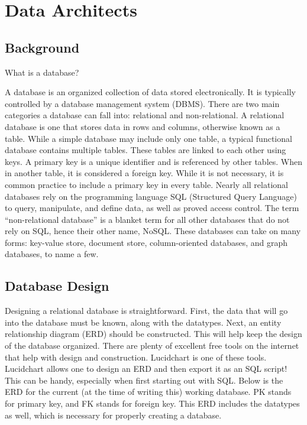 \documentclass[]{book}
\begin{document}
\chapter{Data Architects}\label{data-architects}

\section{Background}\label{background}

What is a database?

A database is an organized collection of data stored electronically. It
is typically controlled by a database management system (DBMS). There
are two main categories a database can fall into: relational and
non-relational. A relational database is one that stores data in rows
and columns, otherwise known as a table. While a simple database may
include only one table, a typical functional database contains multiple
tables. These tables are linked to each other using keys. A primary key
is a unique identifier and is referenced by other tables. When in
another table, it is considered a foreign key. While it is not
necessary, it is common practice to include a primary key in every
table. Nearly all relational databases rely on the programming language
SQL (Structured Query Language) to query, manipulate, and define data,
as well as proved access control. The term ``non-relational database''
is a blanket term for all other databases that do not rely on SQL, hence
their other name, NoSQL. These databases can take on many forms:
key-value store, document store, column-oriented databases, and graph
databases, to name a few.

\section{Database Design}\label{database-design}

Designing a relational database is straightforward. First, the data that
will go into the database must be known, along with the datatypes. Next,
an entity relationship diagram (ERD) should be constructed. This will
help keep the design of the database organized. There are plenty of
excellent free tools on the internet that help with design and
construction. Lucidchart is one of these tools. Lucidchart allows one to
design an ERD and then export it as an SQL script! This can be handy,
especially when first starting out with SQL. Below is the ERD for the
current (at the time of writing this) working database. PK stands for
primary key, and FK stands for foreign key. This ERD includes the
datatypes as well, which is necessary for properly creating a database.
\end{document}
